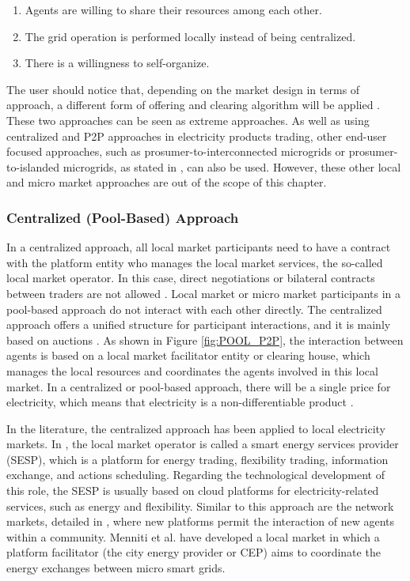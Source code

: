 \begin{enumerate}
\item Agents are willing to share their resources among each other.
\item The grid operation is performed locally instead of being centralized.
\item There is a willingness to self-organize.
\end{enumerate}

The user should notice that, depending on the market design in terms of approach, a different form of offering and clearing algorithm will be applied \cite{Pinson2017}. These two approaches can be seen as extreme approaches. As well as using centralized and P2P approaches in electricity products trading, other end-user focused approaches, such as prosumer-to-interconnected microgrids or prosumer-to-islanded microgrids, as stated in \cite{parag2016electricity}, can also be used. However, these other local and micro market approaches are out of the scope of this chapter.

\subsubsection{Centralized (Pool-Based) Approach}
In a centralized approach, all local market participants need to have a contract with the platform entity who manages the local market services, the so-called local market operator. In this case, direct negotiations or bilateral contracts between traders are not allowed \cite{DesignElectricityMarketRossetoo2017}. Local market or micro market participants in a pool-based approach do not interact with each other directly. The centralized approach offers a unified structure for participant interactions, and it is mainly based on auctions \cite{vytelingum2010trading}. As shown in Figure \ref{fig:POOL_P2P}, the interaction between agents is based on a local market facilitator entity or clearing house, which manages the local resources and coordinates the agents involved in this local market. In a centralized or pool-based approach, there will be a single price for electricity, which means that electricity is a non-differentiable product \cite{Pinson2017}.

In the literature, the centralized approach has been applied to local electricity markets. In \cite{ilieva2016design}, the local market operator is called a smart energy services provider (SESP), which is a platform for energy trading, flexibility trading, information exchange, and actions scheduling. Regarding the technological development of this role, the SESP is usually based on cloud platforms for electricity-related services, such as energy and flexibility. Similar to this approach are the network markets, detailed in \cite{parker2016platform}, where new platforms permit the interaction of new agents within a community. Menniti et al. \cite{menniti2014future} have developed a local market in which a platform facilitator (the city energy provider or CEP) aims to coordinate the energy exchanges between micro smart grids. 


